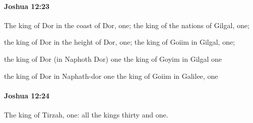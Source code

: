 		\paragraph{Joshua 12:23} %
			\label{JOSHUA-12-23}

			The king of Dor in the coast of Dor, one; the king of the nations of Gilgal, one;

			\begin{versebox}
					\item[BHS] 
					\item[ASV] the king of Dor in the height of Dor, one; the king of Goiim in Gilgal, one;
					\item[NIV] the king of Dor (in Naphoth Dor) one the king of Goyim in Gilgal one
					\item[NRSV] the king of Dor in Naphath-dor one the king of Goiim in Galilee, one
			\end{versebox}

		\paragraph{Joshua 12:24} %
			\label{JOSHUA-12-24}

			The king of Tirzah, one: all the kings thirty and one.

